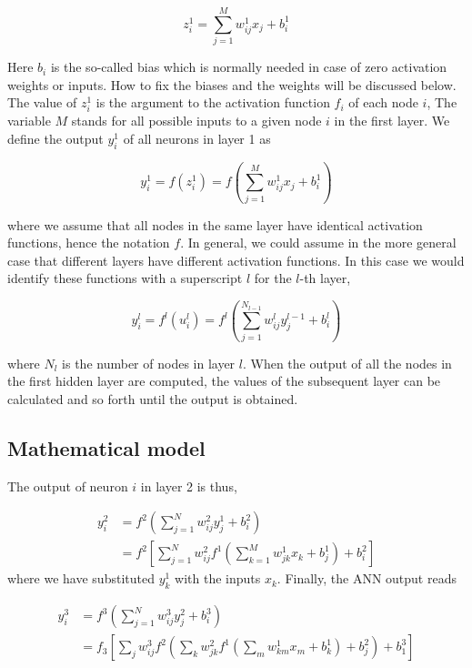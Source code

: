 \documentclass[%
oneside,                 %
final,                   %
10pt]{article}
\begin{document}
\begin{equation} z_i^1 = \sum_{j=1}^{M} w_{ij}^1 x_j + b_i^1
\end{equation}

Here $b_i$ is the so-called bias which is normally needed in
case of zero activation weights or inputs. How to fix the biases and
the weights will be discussed below.  The value of $z_i^1$ is the
argument to the activation function $f_i$ of each node $i$, The
variable $M$ stands for all possible inputs to a given node $i$ in the
first layer.  We define  the output $y_i^1$ of all neurons in layer 1 as

\begin{equation}
 y_i^1 = f(z_i^1) = f\left(\sum_{j=1}^M w_{ij}^1 x_j  + b_i^1\right)
 \label{outputLayer1}
\end{equation}

where we assume that all nodes in the same layer have identical
activation functions, hence the notation $f$. In general, we could assume in the more general case that different layers have different activation functions.
In this case we would identify these functions with a superscript $l$ for the $l$-th layer,

\begin{equation}
 y_i^l = f^l(u_i^l) = f^l\left(\sum_{j=1}^{N_{l-1}} w_{ij}^l y_j^{l-1} + b_i^l\right)
 \label{generalLayer}
\end{equation}

where $N_l$ is the number of nodes in layer $l$. When the output of
all the nodes in the first hidden layer are computed, the values of
the subsequent layer can be calculated and so forth until the output
is obtained.



\subsection*{Mathematical model}

The output of neuron $i$ in layer 2 is thus,

\begin{align}
 y_i^2 &= f^2\left(\sum_{j=1}^N w_{ij}^2 y_j^1 + b_i^2\right) \\
 &= f^2\left[\sum_{j=1}^N w_{ij}^2f^1\left(\sum_{k=1}^M w_{jk}^1 x_k + b_j^1\right) + b_i^2\right]
 \label{outputLayer2}
\end{align}
where we have substituted $y_k^1$ with the inputs $x_k$. Finally, the ANN output reads

\begin{align}
 y_i^3 &= f^3\left(\sum_{j=1}^N w_{ij}^3 y_j^2 + b_i^3\right) \\
 &= f_3\left[\sum_{j} w_{ij}^3 f^2\left(\sum_{k} w_{jk}^2 f^1\left(\sum_{m} w_{km}^1 x_m + b_k^1\right) + b_j^2\right)
  + b_1^3\right]
\end{align}
\end{document}
